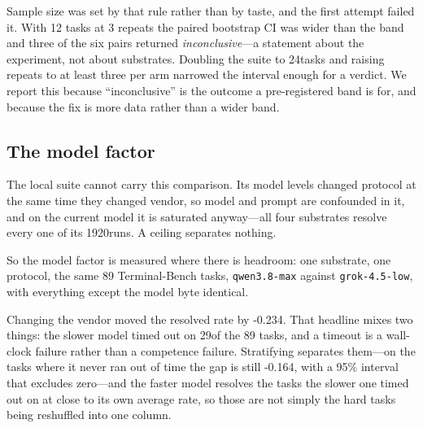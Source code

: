 \documentclass[11pt,a4paper]{article}
\begin{document}
Sample size was set by that rule rather than by taste, and the first attempt
failed it. With 12 tasks at 3 repeats the paired bootstrap CI was wider than
the band and three of the six pairs returned \emph{inconclusive}---a statement
about the experiment, not about substrates. Doubling the suite to
24tasks and raising repeats to at least three per arm narrowed the
interval enough for a verdict. We report this because ``inconclusive'' is the outcome a
pre-registered band is for, and because the fix is more data rather than a
wider band.

\subsection{The model factor}
\label{sec:h3}

The local suite cannot carry this comparison. Its model levels changed protocol
at the same time they changed vendor, so model and prompt are confounded in it,
and on the current model it is saturated anyway---all four substrates resolve
every one of its 1920runs. A ceiling separates nothing.

So the model factor is measured where there is headroom: one substrate, one
protocol, the same 89 Terminal-Bench tasks, \texttt{qwen3.8-max} against
\texttt{grok-4.5-low}, with everything except the model byte identical.

\begin{table}[h]\centering\small
\caption{Changing the model, holding the kernel, the protocol, the tools, the
budget and the task set fixed. The second row removes the tasks where the
slower model ran out of wall clock, because a timeout is not the same kind of
failure as a wrong answer.}
\label{tab:modelfactor}
\end{table}

Changing the vendor moved the resolved rate by -0.234. That headline mixes
two things: the slower model timed out on 29of the 89 tasks, and
a timeout is a wall-clock failure rather than a competence failure. Stratifying
separates them---on the tasks where it never ran out of time the gap is still
-0.164, with a 95\% interval that excludes zero---and the faster model
resolves the tasks the slower one timed out on at close to its own average
rate, so those are not simply the hard tasks being reshuffled into one column.
\end{document}
